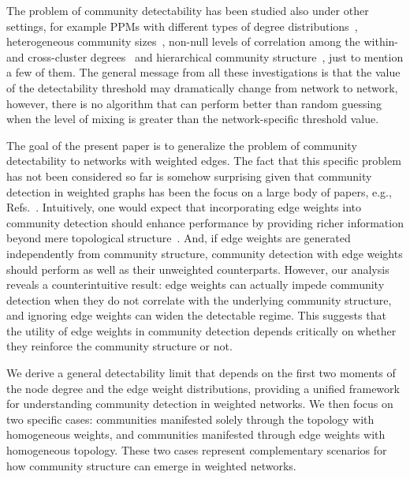 \documentclass[a4paper,pre,superscriptaddress,floatfix,nofootinbib,twocolumn]{revtex4-1}
\begin{document}
The problem of community detectability has been studied also under other settings, for example PPMs with different types of degree distributions~\cite{radicchi2013detectability},
heterogeneous community sizes~\cite{decelle2011inference, abbe2016crossing}, non-null levels of correlation among the within- and cross-cluster degrees~\cite{radicchi2014paradox}
and hierarchical community structure~\cite{peel2024detectability}, just to mention a few of them.
The general message from all these investigations is that the value of the detectability threshold
may dramatically change from network to network, however, there is no algorithm that can
perform better than random guessing when the level of mixing is greater than the
network-specific threshold value.

The goal of the present paper is to
generalize the problem of community detectability to networks with weighted edges.
The fact that this specific problem has not been considered so far is somehow surprising given that community detection
in weighted graphs has been the focus on a large body of papers, e.g., Refs.~\cite{newman2004analysis,alves2007unveiling,lancichinetti2009benchmarks,heimo2008detecting,fan2007accuracy,peixoto2018nonparametric,macmahon2015community,tian2024spreading}.
Intuitively, one would expect that incorporating edge weights into community detection should enhance performance by providing richer information beyond mere topological structure~\cite{kovacs2024iterative,lu2018adaptive,berry2011tolerating,de_meo2013enhancing}. And, if edge weights are generated independently from community structure, community detection with edge weights should perform as well as their unweighted counterparts.
However, our analysis reveals a counterintuitive result: edge weights can actually impede community detection when they do not correlate with the underlying community structure, and ignoring edge weights can widen the detectable regime. This suggests that the utility of edge weights in community detection depends critically on whether they reinforce the community structure or not.

We derive a general detectability limit that depends on the first two moments of the node degree and the edge weight distributions, providing a unified framework for understanding community detection in weighted networks. We then focus on two specific cases: communities manifested solely through the topology with homogeneous weights, and communities manifested through edge weights with homogeneous topology. These two cases represent complementary scenarios for how community structure can emerge in weighted networks.
\end{document}
